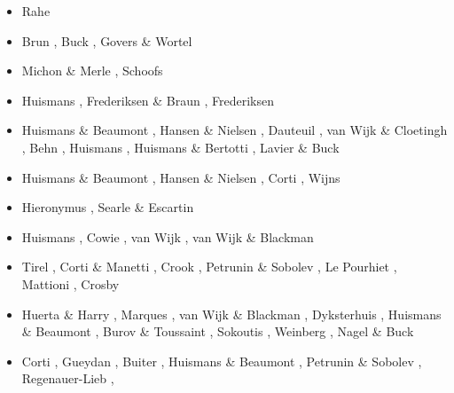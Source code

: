 \begin{scriptsize}
\begin{itemize}
\item[\nineteenninetyeight] Rahe \etal \cite{rafm98}
\item[\nineteenninetynine] Brun \cite{brun99}, Buck \etal \cite{bulp99},
                           Govers \& Wortel \cite{gowo99}
\item[\twothousand] Michon \& Merle \cite{mime00}, Schoofs \etal \cite{scth00}
\item[\twothousandone] Huismans \etal \cite{hupc01,hupc01b}, Frederiksen \& Braun \cite{frbr01}, 
                       Frederiksen \etal \cite{frnb01a,frnb01b}
\item[\twothousandtwo] Huismans \& Beaumont \cite{hube02}, Hansen \& Nielsen \cite{hani02},
                       Dauteuil \etal \cite{dabm02}, van Wijk \& Cloetingh \cite{vacl02},
                       Behn \etal \cite{belz02}, Huismans \etal \cite{hupc02},
                       Huismans \& Bertotti \cite{hube02b}, Lavier \& Buck \cite{labu02}
\item[\twothousandthree] Huismans \& Beaumont \cite{hube03}, Hansen \& Nielsen \cite{hani03},
                         Corti \etal \cite{covb03}, Wijns \etal \cite{wibm03}
\item[\twothousandfour] Hieronymus \cite{hier04}, Searle \& Escartin \cite{sees04}
\item[\twothousandfive] Huismans \etal \cite{hubb05}, Cowie \etal \cite{coub05},
                        van Wijk \cite{vanw05}, van Wijk \& Blackman \cite{vabl05}
\item[\twothousandsix] Tirel \etal \cite{tibs06}, Corti \& Manetti \cite{coma06},
                       Crook \etal \cite{crwy06}, Petrunin \& Sobolev \cite{peso06},
                       Le Pourhiet \etal \cite{lemm06}, Mattioni \etal \cite{malm06}, 
                       Crosby \etal \cite{crms06}
\item[\twothousandseven] Huerta \& Harry \cite{huha07}, Marques \etal \cite{macl07},
                         van Wijk \& Blackman \cite{vabl07}, Dyksterhuis \etal \cite{dyrm07},
                         Huismans \& Beaumont \cite{hube07}, Burov \& Toussaint \cite{buto07},
                         Sokoutis \etal \cite{socb07}, Weinberg \etal \cite{werr07},
                         Nagel \& Buck \cite{nabu07}
\item[\twothousandeight] Corti \cite{cort08}, Gueydan \etal \cite{gumb08},
                         Buiter \etal \cite{buhb08}, Huismans \& Beaumont \cite{hube08},
                         Petrunin \& Sobolev \cite{peso08}, Regenauer-Lieb \etal \cite{rerw08},

\end{itemize}
\end{scriptsize}
